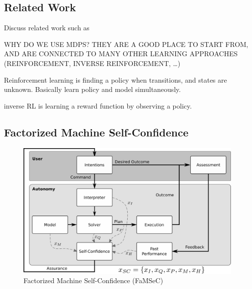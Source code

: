 


\subsection{Related Work}
    Discuss related work such as

    WHY DO WE USE MDPS? THEY ARE A GOOD PLACE TO START FROM, AND ARE CONNECTED TO MANY OTHER LEARNING APPROACHES (REINFORCEMENT, INVERSE REINFORCEMENT, \ldots)

    Reinforcement learning is finding a policy when transitions, and states are unknown. Basically learn policy and model simultaneously.

    inverse RL is learning a reward function by observing a policy.

\subsection{Factorized Machine Self-Confidence}
    \begin{figure}[tbp]
        \centering
        \includegraphics[width=0.55\linewidth]{Figures/FaMSeC.png}
        \caption{Factorized Machine Self-Confidence (FaMSeC)}
        \label{fig:famsec}
    \end{figure}

